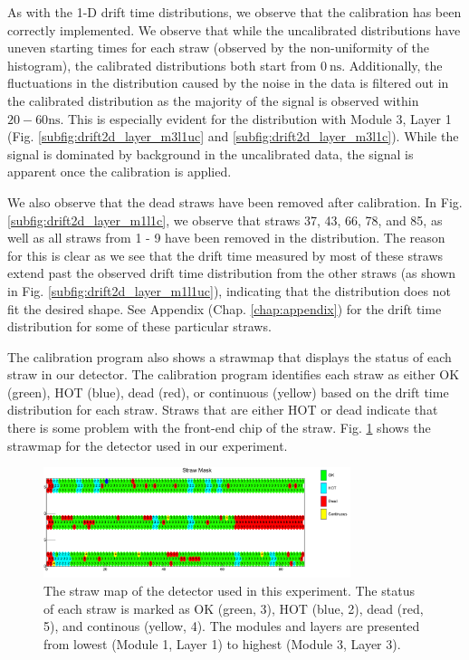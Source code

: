 \documentclass[a4paper]{report}
\numberwithin{equation}{section}
\begin{document}
As with the 1-D drift time distributions, we observe that the calibration has been correctly implemented. We observe that while the 
uncalibrated distributions have uneven starting times for each straw (observed by the non-uniformity of the histogram), the calibrated 
distributions both start from $\SI{0}{\nano\second}$. Additionally, the fluctuations in the distribution caused by the noise
in the data is filtered out in the calibrated distribution as the majority of the signal is observed within $20 - 60 \si{\nano\second}$. 
This is especially evident for the distribution with Module 3, Layer 1 (Fig. \ref{subfig:drift2d_layer_m3l1uc} and \ref{subfig:drift2d_layer_m3l1c}). 
While the signal is dominated by background in the uncalibrated data, the signal is apparent once the calibration is applied. \par 

We also observe that the dead straws have been removed after calibration. In Fig. \ref{subfig:drift2d_layer_m1l1c}, we observe that 
straws 37, 43, 66, 78, and 85, as well as all straws from 1 - 9 have been removed in the distribution. The reason for this is clear as we see that 
the drift time measured by most of these straws extend past the observed drift time distribution from the other straws (as shown in Fig. 
\ref{subfig:drift2d_layer_m1l1uc}), indicating that the distribution does not fit the desired shape. See Appendix (Chap. \ref{chap:appendix}) for the drift time 
distribution for some of these particular straws. \par 

The calibration program also shows a strawmap that displays the status of each straw in our detector. The calibration program 
identifies each straw as either OK (green), HOT (blue), dead (red), or continuous (yellow) based on the drift time distribution 
for each straw. Straws that are either HOT or dead indicate that there is some problem with the front-end chip of the straw.
Fig. \ref{fig:calib_strawmap} shows the strawmap for the detector used in our experiment. 

\begin{figure}[!h]
	\centering
	\includegraphics[width=0.8\textwidth]{calib_strawmask.png}
	\caption{The straw map of the detector used in this experiment. The status of each straw is marked as OK (green, 3), 
	HOT (blue, 2), dead (red, 5), and continous (yellow, 4). The modules and layers are presented from lowest 
	(Module 1, Layer 1) to highest (Module 3, Layer 3).}
	\label{fig:calib_strawmap}
\end{figure}
\end{document}
